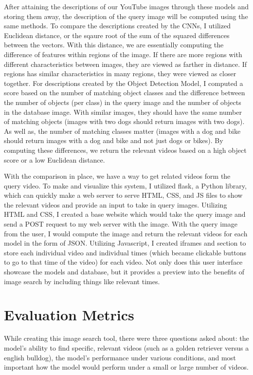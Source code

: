 \documentclass[10pt,twocolumn]{article}
\begin{document}
After attaining the descriptions of our YouTube images through these models and storing them away, the description of the query image will be computed using the same methods. To compare the descriptions created by the CNNs, I utilized Euclidean distance, or the sqaure root of the sum of the squared differences between the vectors. With this distance, we are essentially computing the difference of features within regions of the image. If there are more regions with different characteristics between images, they are viewed as farther in distance. If regions has similar characteristics in many regions, they were viewed as closer together. For descriptions created by the Object Detection Model, I computed a score based on the number of matching object classes and the difference between the number of objects (per class) in the query image and the number of objects in the database image. With similar images, they should have the same number of matching objects (images with two dogs should return images with two dogs). As well as, the number of matching classes matter (images with a dog and bike should return images with a dog and bike and not just dogs or bikes). By computing these differences, we return the relevant videos based on a high object score or a low Euclidean distance. 

With the comparison in place, we have a way to get related videos form the query video. To make and visualize this system, I utilized flask, a Python library, which can quickly make a web server to serve HTML, CSS, and JS files to show the relevant videos and provide an input to take in query images. Utilizing HTML and CSS, I created a base website which would take the query image and send a POST request to my web server with the image. With the query image from the user, I would compute the image and return the relevant videos for each model in the form of JSON. Utilizing Javascript, I created iframes and section to store each individual video and individual times (which became clickable buttons to go to that time of the video) for each video. Not only does this user interface showcase the models and database, but it provides a preview into the benefits of image search by including things like relevant times. 

\section{Evaluation Metrics}


While creating this image search tool, there were three questions asked about: the model's ability to find specific, relevant videos (such as a golden retriever versus a english bulldog), the model's performance under various conditions, and most important how the model would perform under a small or large number of videos. 
\end{document}
